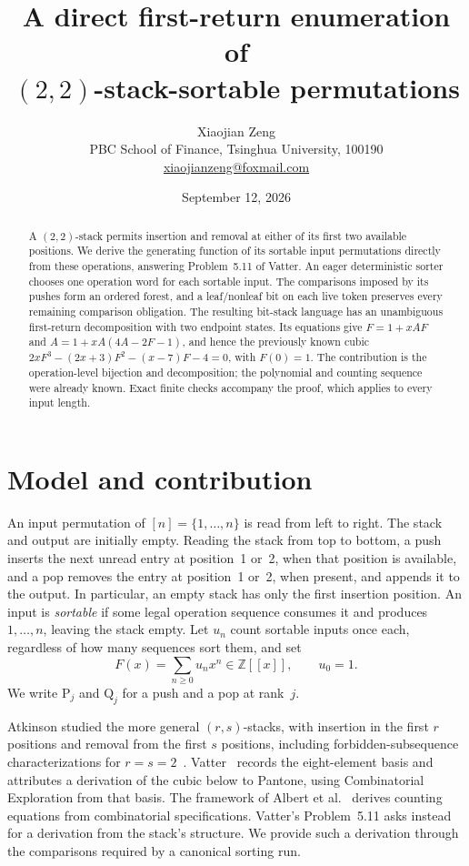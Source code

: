 \documentclass[11pt,a4paper]{article}
\title{A direct first-return enumeration of\\$(2,2)$-stack-sortable permutations}\hypersetup{pdfauthor={Xiaojian Zeng},pdftitle={A direct first-return enumeration of (2,2)-stack-sortable permutations}}
\author{Xiaojian Zeng\\[2pt]
  \small PBC School of Finance, Tsinghua University, 100190\\
  \small \href{mailto:xiaojianzeng@foxmail.com}{xiaojianzeng@foxmail.com}}
\date{September 12, 2026}
\theoremstyle{remark}
\newcommand{\PP}{\mathrm{P}}
\newcommand{\QQ}{\mathrm{Q}}
\newcommand{\Z}{\mathbb{Z}}
\begin{document}
\maketitle
\begin{abstract}
A $(2,2)$-stack permits insertion and removal at either of its first
two available positions. We derive the generating function of its sortable
input permutations directly from these operations, answering Problem~5.11
of Vatter. An eager deterministic sorter chooses one operation word for each
sortable input. The comparisons imposed by its pushes form an ordered
forest, and a leaf/nonleaf bit on each live token preserves every remaining
comparison obligation. The resulting bit-stack language has an unambiguous
first-return decomposition with two endpoint states. Its equations give
$F=1+xAF$ and $A=1+xA(4A-2F-1)$, and hence the previously known cubic
$2xF^3-(2x+3)F^2-(x-7)F-4=0$, with $F(0)=1$.
The contribution is the operation-level bijection and decomposition;
the polynomial and counting sequence were already known. Exact finite
checks accompany the proof, which applies to every input length.
\end{abstract}

\section{Model and contribution}

An input permutation of $[n]=\{1,\ldots,n\}$ is read from left to right.
The stack and output are initially empty. Reading the stack from top to
bottom, a push inserts the next unread entry at position~1 or~2, when that
position is available, and a pop removes the entry at position~1 or~2,
when present, and appends it to the output. In particular, an empty stack
has only the first insertion position. An input is \emph{sortable} if some
legal operation sequence consumes it and produces $1,\ldots,n$, leaving
the stack empty. Let $u_n$ count sortable inputs once each, regardless of
how many sequences sort them, and set
\[
 F(x)=\sum_{n\geq0}u_nx^n\in\Z[[x]],\qquad u_0=1.
\]
We write $\PP_j$ and $\QQ_j$ for a push and a pop at rank~$j$.

Atkinson studied the more general $(r,s)$-stacks, with insertion in the
first $r$ positions and removal from the first $s$ positions, including
forbidden-subsequence characterizations for $r=s=2$~\cite{Atkinson1998}.
Vatter~\cite[Theorem~5.9 and the paragraph before Problem~5.11]{Vatter2026}
records the eight-element basis and attributes a derivation of the cubic
below to Pantone, using Combinatorial Exploration from that basis.
The framework of Albert et al.~\cite{AlbertEtAl2026} derives counting
equations from combinatorial specifications. Vatter's Problem~5.11 asks
instead for a derivation from the stack's structure. We provide such a
derivation through the comparisons required by a canonical sorting run.
\end{document}
